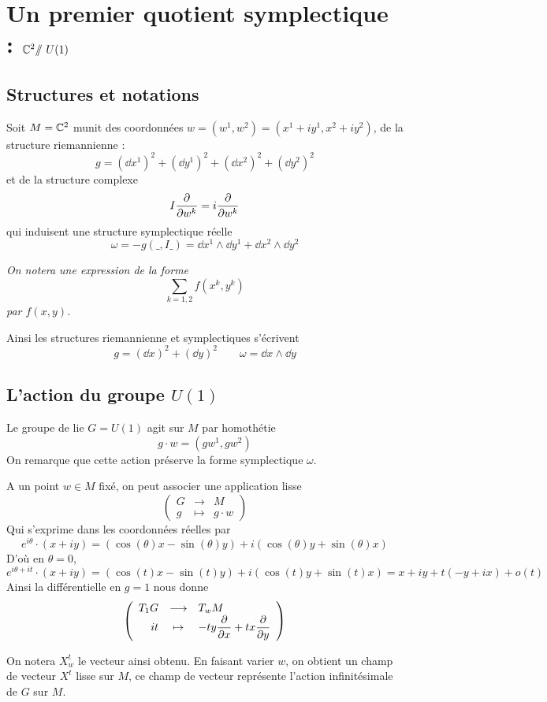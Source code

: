 \documentclass[a4paper,10pt]{article}
\begin{document}
\section{Un premier quotient symplectique : $\mathbb{C}^2/\!\!/\ U(1)$}
\subsection{Structures et notations}
Soit $M = \mathbb{C}^2$ munit des coordonnées $w = (w^1,w^2) = (x^1 + i y^1,x^2 + i y^2)$, de la structure riemannienne : 
\[
g = (\dd x^1)^2 + (\dd y^1)^2 + (\dd x^2)^2 + (\dd y^2)^2
\]
et de la structure complexe
\[
I \dfrac{\partial{}}{\partial{w^k}} = i \dfrac{\partial{}}{\partial{w^k}}
\]
qui induisent une structure symplectique réelle
\[
\omega = -g(\_,I\_) = \dd x^1 \wedge \dd y^1 + \dd x^2 \wedge \dd y^2
\]


\bigskip
\begin{center}
\textit{On notera une expression de la forme 
\[
\sum_{k=1,2} f(x^k,y^k)
\]
par $f(x,y)$.}
\end{center}
\bigskip

Ainsi les structures riemannienne et symplectiques s'écrivent
\[
g = (\dd x)^2 + (\dd y)^2 \qquad \omega = \dd x \wedge \dd y
\]

\subsection{L'action du groupe $U(1)$}
Le groupe de lie $G = U(1)$ agit sur $M$ par homothétie
\[
g \cdot w = (gw^1,gw^2)
\]
On remarque que cette action préserve la forme symplectique $\omega$.

A un point $w \in  M$ fixé, on peut associer une application lisse
\[
\left(
\begin{array}{rcl}
G & \longrightarrow & M \\
g & \mapsto & g\cdot w
\end{array}
\right)
\]
Qui s'exprime dans les coordonnées réelles par
\[
e^{i\theta}\cdot (x+ i y) = (\cos(\theta)x -\sin(\theta)y) + i (\cos(\theta)y + \sin(\theta)x)
\]
D'où en $\theta = 0$,
\[
e^{i\theta + it}\cdot (x+ i y) = (\cos(t)x-\sin(t)y) + i (\cos(t)y +\sin(t)x) = x + i y + t(-y+ix) + o(t)
\]
Ainsi la différentielle en $g = 1$ nous donne
\[
\left(
\begin{array}{rcl}
T_1 G & \longrightarrow & T_w M \\
it & \mapsto & -ty\dfrac{\partial{}}{\partial{x}} + tx\dfrac{\partial{}}{\partial{y}}
\end{array}
\right)
\]

On notera $X_w^t$ le vecteur ainsi obtenu. En faisant varier $w$, on obtient un champ de vecteur $X^t$ lisse sur $M$, ce champ de vecteur représente l'action infinitésimale de $G$ sur $M$.
\end{document}
